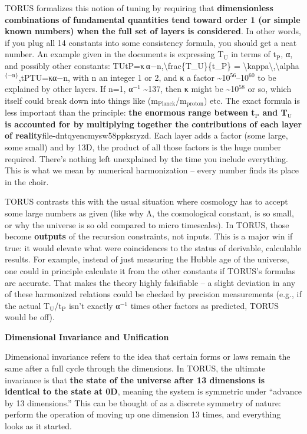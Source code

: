 \documentclass[]{article}
\newcommand{\subscript}[1]{\ensuremath{_{\mathrm{#1}}}}
\newcommand{\superscript}[1]{\ensuremath{^{\mathrm{#1}}}}
\begin{document}
TORUS formalizes this notion of tuning by requiring that
\textbf{dimensionless combinations of fundamental quantities tend toward
order 1 (or simple known numbers) when the full set of layers is
considered}​. In other words, if you plug all 14 constants into some
consistency formula, you should get a neat number. An example given in
the documents is expressing
T\subscript{U} in terms of
t\subscript{P}, α, and
possibly other constants:
TUtP=κ α−n,\textbackslash{}frac\{T\_U\}\{t\_P\} =
\textbackslash{}kappa\textbackslash{},\textbackslash{}alpha\superscript{\{-n\}},tP​TU​​=κα−n,
with n an integer 1 or 2, and κ a factor
\textasciitilde{}10\superscript{56}--10\superscript{60} to be explained by other layers​. If
n=1, α\superscript{−1} \textasciitilde{}137, then κ might be
\textasciitilde{}10\superscript{58} or so, which itself could break down into
things like
(m\subscript{Planck}/m\subscript{proton})
etc. The exact formula is less important than the principle: \textbf{the
enormous range between
t\subscript{P} and
T\subscript{U} is accounted
for by multiplying together the contributions of each layer of
reality}​file-dntqyencmysw58ppksryzd. Each layer adds a factor (some
large, some small) and by 13D, the product of all those factors is the
huge number required. There's nothing left unexplained by the time you
include everything. This is what we mean by numerical harmonization --
every number finds its place in the choir.

TORUS contrasts this with the usual situation where cosmology has to
accept some large numbers as given (like why Λ, the cosmological
constant, is so small, or why the universe is so old compared to micro
timescales). In TORUS, those become \textbf{outputs} of the recursion
constraints, not inputs​. This is a major win if true: it would elevate
what were coincidences to the status of derivable, calculable results​.
For example, instead of just measuring the Hubble age of the universe,
one could in principle calculate it from the other constants if TORUS's
formulas are accurate. That makes the theory highly falsifiable -- a
slight deviation in any of these harmonized relations could be checked
by precision measurements (e.g., if the actual
T\subscript{U}/t\subscript{P}
isn't exactly α\superscript{−1} times other factors as predicted, TORUS would be
off).

\textbf{Dimensional Invariance and Unification}

Dimensional invariance refers to the idea that certain forms or laws
remain the same after a full cycle through the dimensions. In TORUS, the
ultimate invariance is that \textbf{the state of the universe after 13
dimensions is identical to the state at 0D}, meaning the system is
symmetric under ``advance by 13 dimensions.'' This can be thought of as
a discrete symmetry of nature: perform the operation of moving up one
dimension 13 times, and everything looks as it started​.
\end{document}
